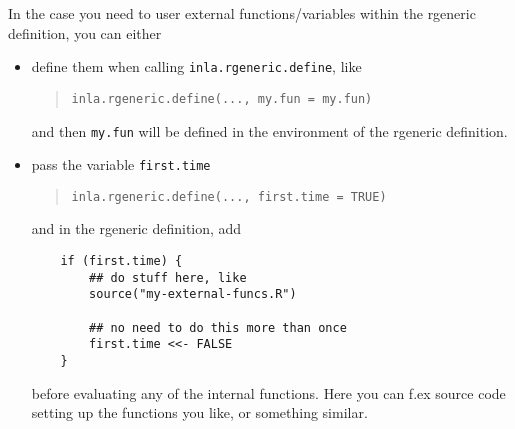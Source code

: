 \documentclass[a4paper,11pt]{article}
\begin{document}
In the case you need to user external functions/variables within the rgeneric
definition, you can either
\begin{itemize}
\item define them when calling \verb|inla.rgeneric.define|, like
    \begin{quote}
        \verb|inla.rgeneric.define(..., my.fun = my.fun)|
    \end{quote}
    and then \verb|my.fun| will be defined in the environment of the
    rgeneric definition.
\item pass  the variable \verb|first.time|
    \begin{quote}
        \verb|inla.rgeneric.define(..., first.time = TRUE)|
    \end{quote}
    and in the rgeneric definition, add
\begin{verbatim}
    if (first.time) {
        ## do stuff here, like
        source("my-external-funcs.R")

        ## no need to do this more than once
        first.time <<- FALSE
    }
\end{verbatim}
before evaluating any of the internal functions. Here you can f.ex
source code setting up the functions you like, or something similar. 
\end{itemize}
\end{document}
